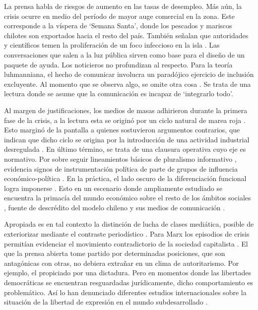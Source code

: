 \documentclass{textolivre}
\begin{document}
La prensa habla de riesgos de aumento en las tasas de desempleo. Más aún, la
crisis ocurre en medio del período de mayor auge comercial en la zona. Este corresponde
a la víspera de ‘Semana Santa’, donde los pescados y mariscos chilotes son exportados
hacia el resto del país. También señalan que autoridades y científicos temen la
proliferación de un foco infeccioso en la isla \cite{nunez}. Las conversaciones que
salen a la luz pública sirven como base para el diseño de un paquete de ayuda. Los
noticieros no profundizan al respecto. Para la teoría luhmanniana, el hecho de comunicar
involucra un paradójico ejercicio de inclusión excluyente. Al momento que se observa
algo, se omite otra cosa \cite{becerra2013,Luhmann2007}. Se trata de una
lectura donde se asume que la comunicación es incapaz de ‘integrarlo todo’.

Al margen de justificaciones, los medios de masas adhirieron durante la primera
fase de la crisis, a la lectura esta se originó por un ciclo natural de marea roja
\cite{Kamjunke2017}. Esto marginó de la pantalla a quienes sostuvieron argumentos
contrarios, que indican que dicho ciclo se origina por la introducción de una actividad
industrial desregulada \cite{ciudadano2016}. En último término, se trata de una
clausura operativa cuyo eje es normativo. Por sobre seguir lineamientos básicos de
pluralismo informativo \cite{Habermas2006}, evidencia signos de instrumentación política
de parte de grupos de influencia económico-política \cite{sapiezynska2013}. En la
práctica, el lado oscuro de la diferenciación funcional logra imponerse \cite{teubner2012}.
Esto en un escenario donde ampliamente estudiado se encuentra la primacía del mundo
económico sobre el resto de los ámbitos sociales \cite{palet,solimano},
fuente de descrédito del modelo chileno y sus medios de comunicación \cite{almeida,cardenas2019}.

Apropiada es en tal contexto la distinción de lucha de clases mediática, posible de
exteriorizar mediante el contraste periodístico \cite{desconcierto,tercera}. 
Para Marx los episodios de crisis permitían evidenciar el movimiento contradictorio
de la sociedad capitalista \cite{marx2010}. El que la prensa abierta tome partido por
determinadas posiciones, que son antagónicas con otras, no debiera extrañar en un clima
de autoritarismo. Por ejemplo, el propiciado por una dictadura. Pero en momentos donde
las libertades democráticas se encuentran resguardadas jurídicamente, dicho
comportamiento es problemático. Así lo han denunciado diferentes estudios
internacionales sobre la situación de la libertad de expresión en el mundo subdesarrollado
\cite{newman2019}.
\end{document}
